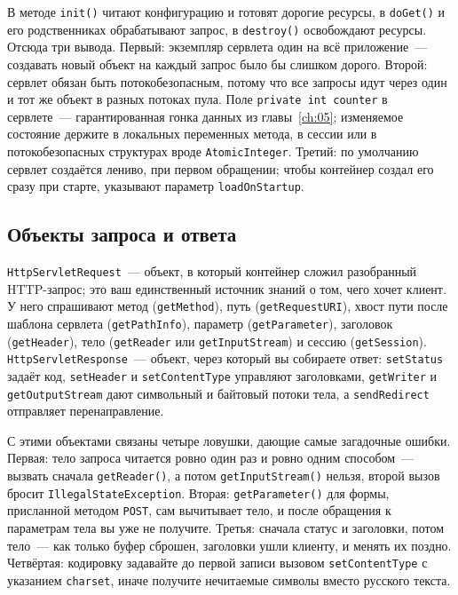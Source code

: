 В методе \texttt{init()} читают конфигурацию и готовят дорогие ресурсы, в
\texttt{doGet()} и его родственниках обрабатывают запрос, в \texttt{destroy()}
освобождают ресурсы. Отсюда три вывода. Первый: экземпляр сервлета один на всё
приложение~--- создавать новый объект на каждый запрос было бы слишком дорого.
Второй: сервлет обязан быть потокобезопасным, потому что все запросы идут через
один и тот же объект в разных потоках пула. Поле \texttt{private int counter} в
сервлете~--- гарантированная гонка данных из главы~\ref{ch:05}; изменяемое
состояние держите в локальных переменных метода, в сессии или в
потокобезопасных структурах вроде \texttt{AtomicInteger}. Третий: по умолчанию
сервлет создаётся лениво, при первом обращении; чтобы контейнер создал его
сразу при старте, указывают параметр \texttt{loadOnStartup}.

\subsection{Объекты запроса и ответа}

\texttt{HttpServletRequest}~--- объект, в который контейнер сложил разобранный
HTTP-запрос; это ваш единственный источник знаний о том, чего хочет клиент. У
него спрашивают метод (\texttt{getMethod}), путь (\texttt{getRequestURI}),
хвост пути после шаблона сервлета (\texttt{getPathInfo}), параметр
(\texttt{getParameter}), заголовок (\texttt{getHeader}), тело
(\texttt{getReader} или \texttt{getInputStream}) и сессию
(\texttt{getSession}). \texttt{HttpServletResponse}~--- объект, через который вы
собираете ответ: \texttt{setStatus} задаёт код, \texttt{setHeader} и
\texttt{setContentType} управляют заголовками, \texttt{getWriter} и
\texttt{getOutputStream} дают символьный и байтовый потоки тела, а
\texttt{sendRedirect} отправляет перенаправление.

С этими объектами связаны четыре ловушки, дающие самые загадочные ошибки.
Первая: тело запроса читается ровно один раз и ровно одним способом~--- вызвать
сначала \texttt{getReader()}, а потом \texttt{getInputStream()} нельзя, второй
вызов бросит \texttt{IllegalStateException}. Вторая: \texttt{getParameter()} для
формы, присланной методом \texttt{POST}, сам вычитывает тело, и после обращения
к параметрам тела вы уже не получите. Третья: сначала статус и заголовки, потом
тело~--- как только буфер сброшен, заголовки ушли клиенту, и менять их поздно.
Четвёртая: кодировку задавайте до первой записи вызовом
\texttt{setContentType} с указанием \texttt{charset}, иначе получите
нечитаемые символы вместо русского текста.

